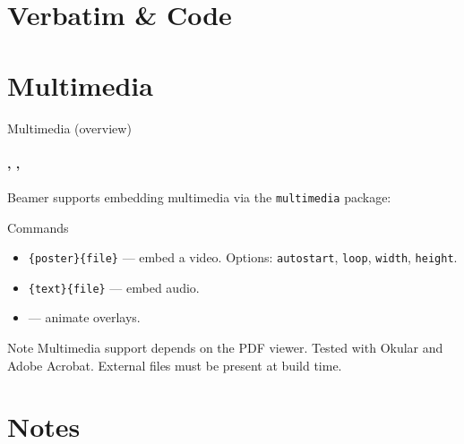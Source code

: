 \documentclass[sans,numeric,titlesplit]{qslides}
\begin{document}
\section{Verbatim \& Code}


\section{Multimedia}

\begin{frame}{Multimedia (overview)}
  \framesubtitle{\texttt{\string\movie}, \texttt{\string\sound}, \texttt{\string\animate}}
  Beamer supports embedding multimedia via the \texttt{multimedia} package:
  \begin{block}{Commands}
    \begin{itemize}
      \item \texttt{\string\movie\{poster\}\{file\}} --- embed a video.
        Options: \texttt{autostart}, \texttt{loop}, \texttt{width}, \texttt{height}.
      \item \texttt{\string\sound\{text\}\{file\}} --- embed audio.
      \item \texttt{\string\animate} --- animate overlays.
    \end{itemize}
  \end{block}
  \begin{alertblock}{Note}
    Multimedia support depends on the PDF viewer. Tested with Okular and
    Adobe Acrobat. External files must be present at build time.
  \end{alertblock}
\end{frame}

\section{Notes}
\end{document}
